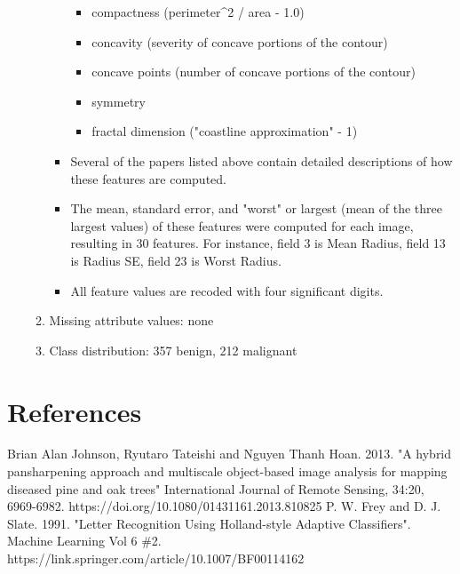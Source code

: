 \documentclass[12pt]{article}
\begin{document}
\begin{enumerate}
\begin{enumerate}
\begin{itemize}
\begin{itemize}
                \item compactness (perimeter^2 / area - 1.0)
                \item concavity (severity of concave portions of the contour)
                \item concave points (number of concave portions of the contour)
                \item symmetry 
                \item fractal dimension ("coastline approximation" - 1)
            \end{itemize}
            \item Several of the papers listed above contain detailed descriptions of how these features are computed.
            \item The mean, standard error, and "worst" or largest (mean of the three largest values) of these features were computed for each image, resulting in 30 features.  For instance, field 3 is Mean Radius, field 13 is Radius SE, field 23 is Worst Radius.
            \item All feature values are recoded with four significant digits.
        \end{itemize}
        \item Missing attribute values: none
        \item Class distribution: 357 benign, 212 malignant
    \end{enumerate}
\end{enumerate}

\section{References}
Brian Alan Johnson, Ryutaro Tateishi and Nguyen Thanh Hoan. 2013. "A hybrid pansharpening approach and multiscale object-based image analysis for mapping diseased pine and oak trees" International Journal of Remote Sensing, 34:20, 6969-6982. https://doi.org/10.1080/01431161.2013.810825
P. W. Frey and D. J. Slate. 1991. "Letter Recognition Using Holland-style Adaptive Classifiers". Machine Learning Vol 6 \#2. https://link.springer.com/article/10.1007/BF00114162
\end{document}
